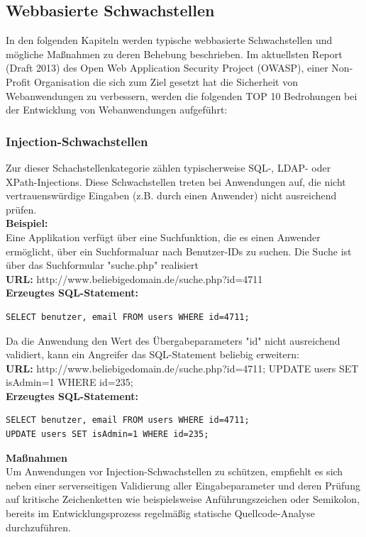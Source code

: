 \subsection{Webbasierte Schwachstellen}

In den folgenden Kapiteln werden typische webbasierte Schwachstellen und mögliche Maßnahmen zu deren Behebung beschrieben.
Im aktuellsten Report (Draft 2013) des Open Web Application Security Project (OWASP), einer Non-Profit Organisation die sich zum Ziel gesetzt hat die Sicherheit von Webanwendungen zu verbessern, werden die folgenden TOP 10 Bedrohungen bei der Entwicklung von Webanwendungen aufgeführt:


\subsubsection{Injection-Schwachstellen}

Zur dieser Schachstellenkategorie zählen typischerweise SQL-, LDAP- oder XPath-Injections. Diese Schwachstellen treten bei Anwendungen auf, die nicht vertrauenswürdige Eingaben (z.B. durch einen Anwender) nicht ausreichend prüfen.
\\
\textbf{Beispiel:}
\\
Eine Applikation verfügt über eine Suchfunktion, die es einen Anwender ermöglicht, über ein Suchformaluar nach Benutzer-IDs
zu suchen. Die Suche ist über das Suchformular "suche.php" realisiert
\\
\textbf{URL:} http://www.beliebigedomain.de/suche.php?id=4711
\\
\textbf{Erzeugtes SQL-Statement:}
\begin{lstlisting}[basicstyle=\ttfamily\footnotesize]
SELECT benutzer, email FROM users WHERE id=4711;
\end{lstlisting}
Da die Anwendung den Wert des Übergabeparameters "id" nicht ausreichend validiert, kann ein Angreifer das SQL-Statement beliebig erweitern:
\\
\textbf{URL:} http://www.beliebigedomain.de/suche.php?id=4711; UPDATE users SET\\isAdmin=1 WHERE id=235;
\\
\textbf{Erzeugtes SQL-Statement:}
\begin{lstlisting}[basicstyle=\ttfamily\footnotesize]
SELECT benutzer, email FROM users WHERE id=4711; 
UPDATE users SET isAdmin=1 WHERE id=235;
\end{lstlisting}

\textbf{Maßnahmen}
\\
Um Anwendungen vor Injection-Schwachstellen zu schützen, empfiehlt es sich neben einer serverseitigen Validierung aller Eingabeparameter und deren Prüfung auf kritische Zeichenketten wie beispielsweise Anführungszeichen oder Semikolon, bereits im Entwicklungsprozess regelmäßig statische Quellcode-Analyse durchzuführen.


